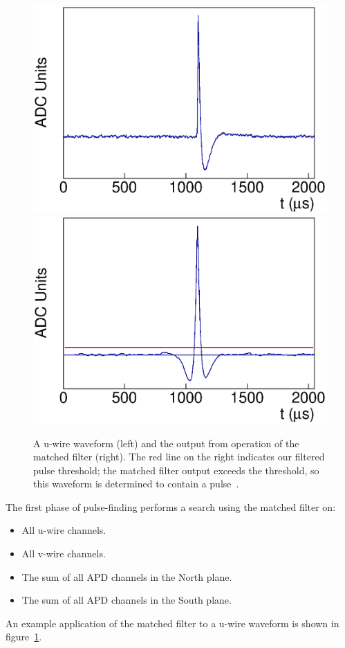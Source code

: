 \begin{figure}
\begin{center}
\includegraphics[keepaspectratio=true,width=.49\textwidth]{MFExamp_Raw.eps}
\includegraphics[keepaspectratio=true,width=.49\textwidth]{MFExamp_Applied.eps}
\end{center}
\renewcommand{\baselinestretch}{1}
\small\normalsize
\begin{quote}
\caption{A u-wire waveform (left) and the output from operation of the matched filter (right).  The red line on the right indicates our filtered pulse threshold; the matched filter output exceeds the threshold, so this waveform is determined to contain a pulse~\cite{ReconstructionDocument}.}
\label{fig:MatchedFilterApplication}
\end{quote}
\end{figure}
\renewcommand{\baselinestretch}{2}
\small\normalsize

The first phase of pulse-finding performs a search using the matched filter on:
\begin{itemize}
\item All u-wire channels.
\item All v-wire channels.
\item The sum of all APD channels in the North plane.
\item The sum of all APD channels in the South plane.
\end{itemize}
An example application of the matched filter to a u-wire waveform is shown in figure~\ref{fig:MatchedFilterApplication}.

